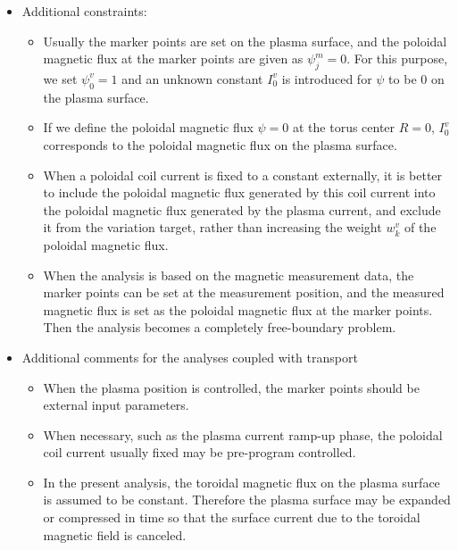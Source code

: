 \documentclass[11pt]{article}
\begin{document}
\begin{itemize}
\item
  Additional constraints:
  \begin{itemize}
    \itemsep=5pt
  \item
    Usually the marker points are set on the plasma surface, and the
    poloidal magnetic flux at the marker points are given as
    $\psi_j^m=0$.  For this purpose, we set $\psi_0^v=1$ and an
    unknown constant $I_0^v$ is introduced for $\psi$ to be $0$ on the
    plasma surface.
  \item
    If we define the poloidal magnetic flux $\psi=0$ at the torus
    center $R=0$, $I_0^v$ corresponds to the poloidal magnetic flux on
    the plasma surface.
  \item
    When a poloidal coil current is fixed to a constant externally, it
    is better to include the poloidal magnetic flux generated by this
    coil current into the poloidal magnetic flux generated by the
    plasma current, and exclude it from the variation target, rather
    than increasing the weight $w_k^v$ of the poloidal magnetic flux.
  \item
    When the analysis is based on the magnetic measurement data,
    the marker points can be set at the measurement position, and the
    measured magnetic flux is set as the poloidal magnetic flux at the
    marker points. Then the analysis becomes a completely
    free-boundary problem.
  \end{itemize}

\item
  Additional comments for the analyses coupled with transport
  \begin{itemize}
    \itemsep=5pt
  \item
    When the plasma position is controlled, the marker points should
    be external input parameters.
  \item
    When necessary, such as the plasma current ramp-up phase, the
    poloidal coil current usually fixed may be pre-program controlled.
  \item
    In the present analysis, the toroidal magnetic flux on the plasma
    surface is assumed to be constant.  Therefore the plasma surface
    may be expanded or compressed in time so that the surface current
    due to the toroidal magnetic field is canceled.
  \end{itemize}
\end{itemize}
\end{document}
